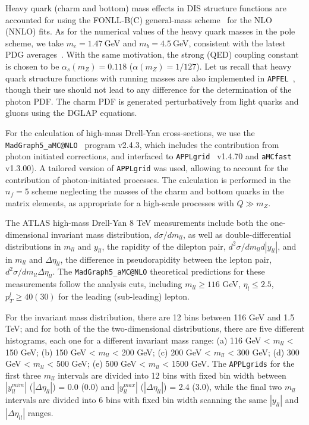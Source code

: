 Heavy quark (charm and bottom) mass effects in DIS structure functions are accounted
for using the FONLL-B(C) general-mass scheme~\cite{Forte:2010ta}
for the NLO (NNLO) fits.
%
As for the numerical values of the heavy quark masses in the pole scheme,
we take  $m_c=1.47~$GeV and $m_b=4.5~$GeV, consistent with the latest
PDG averages~\cite{Agashe:2014kda}.
%
With the same motivation, the strong (QED) coupling constant is chosen to be  $\alpha_s(m_Z)=0.118$
($\alpha(m_Z)=1/127$).
%
Let us recall that heavy quark structure functions with running masses
are also implemented in {\tt APFEL}~\cite{Bertone:2016ywq},
though their use should not lead to any difference for the determination of the photon PDF.
%
The charm PDF is generated perturbatively from light quarks and gluons using
the DGLAP equations.

For the calculation of high-mass Drell-Yan cross-sections,
we use the {\tt MadGraph5{\_}aMC@NLO}~\cite{Alwall:2014hca} program  v2.4.3,
which includes the contribution from photon initiated corrections,
and interfaced to {\tt APPLgrid}~\cite{Carli:2010rw} v1.4.70
and {\tt aMCfast}~\cite{Carli:2010rw} v1.3.00).
%
A tailored version of  {\tt APPLgrid} was used, allowing to account for
the contribution of photon-initiated processes.
%
The calculation is performed in the $n_f=5$ scheme neglecting the masses of the charm
and bottom quarks in the matrix elements, as appropriate for a high-scale processes
with $Q \gg m_Z$.

The ATLAS high-mass Drell-Yan 8 TeV measurements include both the one-dimensional
invariant mass distribution, $d\sigma/dm_{ll}$, as well as double-differential
distributions in $m_{ll}$ and $y_{ll}$, the rapidity of the dilepton pair,
$d^{2}\sigma/dm_{ll}d|y_{ll}|$, and in $m_{ll}$ and $\Delta\eta_{ll}$,
  the difference in 
  pseudorapidity between the lepton pair, $d^{2}\sigma/dm_{ll}\Delta\eta_{ll}$.
  The {\tt MadGraph5{\_}aMC@NLO} theoretical predictions for these measurements
  follow the analysis cuts, including $m_{ll}\ge 116$ GeV,
  $\eta_l\le 2.5$, $p_T^l \ge 40(30)$ for the leading (sub-leading) lepton.

  
  For the invariant mass 
  distribution, there are 12 bins between 116 GeV and 1.5 TeV; and for both of the 
 the two-dimensional distributions, there are five different histograms, each one for a different invariant
 mass range: (a) 116 GeV < $m_{ll}$ < 150 GeV; (b) 150 GeV < $m_{ll}$ < 200 GeV; (c) 200 GeV < $m_{ll}$ < 300 GeV; (d) 300 GeV < $m_{ll}$ < 500 GeV; (e) 500 GeV < $m_{ll}$ < 1500 GeV.
 The {\tt APPLgrids} for the first three $m_{ll}$ intervals are divided into 12 bins with fixed bin 
width between $|y_{ll}^{mim}|$ ($|\Delta\eta_{ll}|$)  = 0.0 (0.0) and $|y_{ll}^{max}|$ ($|\Delta\eta_{ll}|$) = 2.4 (3.0), while the final two $m_{ll}$ intervals are divided into 6 bins with fixed bin width scanning the same $|y_{ll}|$ and $|\Delta\eta_{ll}|$ ranges.

